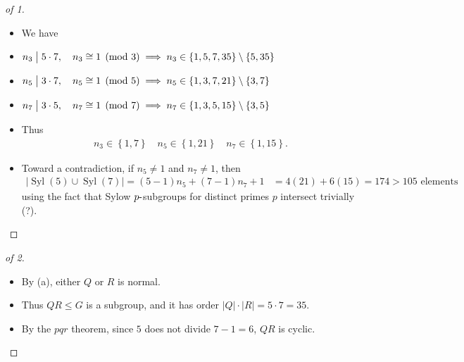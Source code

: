 \begin{solution}

\envlist

\begin{proof}[of 1]

\envlist

\begin{itemize}
\item
  We have
\item
  \(n_3 \bigm|5\cdot 7, \quad n_3 \cong 1 \pmod 3 \implies n_3 \in \left\{{1, 5, 7, 35}\right\} \setminus \left\{{5, 35}\right\}\)
\item
  \(n_5 \bigm|3\cdot 7, \quad n_5 \cong 1 \pmod 5 \implies n_5 \in \left\{{1, 3, 7, 21}\right\}\setminus \left\{{3, 7}\right\}\)
\item
  \(n_7 \bigm|3\cdot 5, \quad n_7 \cong 1 \pmod 7 \implies n_7 \in \left\{{1, 3, 5, 15}\right\}\setminus\left\{{3, 5}\right\}\)
\item
  Thus
  \begin{align*}
  n_3 \in \left\{{1, 7}\right\} \quad n_5 \in \left\{{1, 21}\right\} \quad n_7 \in \left\{{1, 15}\right\}
  .\end{align*}
\item
  Toward a contradiction, if \(n_5\neq 1\) and \(n_7 \neq 1\), then
  \begin{align*}
  {\left\lvert {{\operatorname{Syl}}(5) \cup{\operatorname{Syl}}(7)} \right\rvert} = (5-1)n_5 + (7-1)n_7 + 1 
  &= 4(21) + 6(15) = 174 > 105 \text{ elements}
  \end{align*}
  using the fact that Sylow \(p{\hbox{-}}\)subgroups for distinct primes
  \(p\) intersect trivially (?).
\end{itemize}

\end{proof}

\begin{proof}[of 2]

\envlist

\begin{itemize}
\tightlist
\item
  By (a), either \(Q\) or \(R\) is normal.
\item
  Thus \(QR \leq G\) is a subgroup, and it has order
  \({\left\lvert {Q} \right\rvert} \cdot {\left\lvert {R} \right\rvert} = 5\cdot 7 = 35\).
\item
  By the \(pqr\) theorem, since \(5\) does not divide \(7-1=6\), \(QR\)
  is cyclic.
\end{itemize}


\end{proof}
\end{solution}
